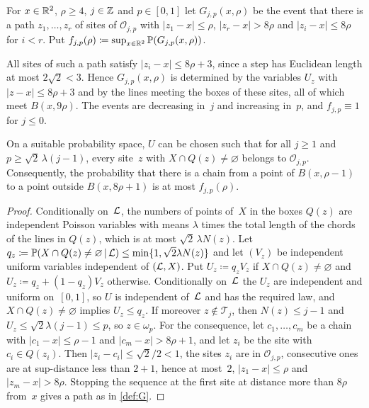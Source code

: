 \documentclass[11pt,letterpaper]{article}
\newcommand{\cO}{\mathcal O}
\newcommand{\cT}{\mathcal T}
\begin{document}
\begin{definition}
\label{def:G}
For $x\in\mathbb R^2$, $\rho\ge4$, $j\in\mathbb Z$ and $p\in[0,1]$ let $G_{j,p}(x,\rho)$ be the event that there is a path $z_1,\dots,z_r$ of sites of $\cO_{j,p}$ with $\lvert z_1-x\rvert\le\rho$, $\lvert z_r-x\rvert>8\rho$ and $\lvert z_i-x\rvert\le8\rho$ for $i<r$. Put $f_{j,p}(\rho)\coloneqq\sup_{x\in\mathbb R^2}\mathbb P(G_{j,p}(x,\rho))$.
\end{definition}

All sites of such a path satisfy $\lvert z_i-x\rvert\le8\rho+3$, since a step has Euclidean length at most $2\sqrt2<3$. Hence $G_{j,p}(x,\rho)$ is determined by the variables $U_z$ with $\lvert z-x\rvert\le8\rho+3$ and by the lines meeting the boxes of these sites, all of which meet $B(x,9\rho)$. The events are decreasing in~$j$ and increasing in~$p$, and $f_{j,p}\equiv1$ for $j\le0$.

\begin{lemma}[Domination]
\label{lem:domination}
On a suitable probability space, $U$ can be chosen such that for all $j\ge1$ and $p\ge\sqrt2\,\lambda(j-1)$, every site~$z$ with $X\cap Q(z)\neq\varnothing$ belongs to $\cO_{j,p}$. Consequently, the probability that there is a chain from a point of $B(x,\rho-1)$ to a point outside $B(x,8\rho+1)$ is at most $f_{j,p}(\rho)$.
\end{lemma}

\begin{proof}
Conditionally on~$\mathcal L$, the numbers of points of~$X$ in the boxes $Q(z)$ are independent Poisson variables with means $\lambda$ times the total length of the chords of the lines in $Q(z)$, which is at most $\sqrt2\,\lambda N(z)$. Let $q_z\coloneqq\mathbb P(X\cap Q(z)\neq\varnothing\,\vert\,\mathcal L)\le\min\{1,\sqrt2\lambda N(z)\}$ and let $(V_z)$ be independent uniform variables independent of $(\mathcal L,X)$. Put $U_z\coloneqq q_zV_z$ if $X\cap Q(z)\neq\varnothing$ and $U_z\coloneqq q_z+(1-q_z)V_z$ otherwise. Conditionally on~$\mathcal L$ the $U_z$ are independent and uniform on~$[0,1]$, so $U$ is independent of~$\mathcal L$ and has the required law, and $X\cap Q(z)\neq\varnothing$ implies $U_z\le q_z$. If moreover $z\notin\cT_j$, then $N(z)\le j-1$ and $U_z\le\sqrt2\lambda(j-1)\le p$, so $z\in\omega_p$. For the consequence, let $c_1,\dots,c_m$ be a chain with $\lvert c_1-x\rvert\le\rho-1$ and $\lvert c_m-x\rvert>8\rho+1$, and let $z_i$ be the site with $c_i\in Q(z_i)$. Then $\lvert z_i-c_i\rvert\le\sqrt2/2<1$, the sites $z_i$ are in $\cO_{j,p}$, consecutive ones are at sup-distance less than $2+1$, hence at most~$2$, $\lvert z_1-x\rvert\le\rho$ and $\lvert z_m-x\rvert>8\rho$. Stopping the sequence at the first site at distance more than $8\rho$ from~$x$ gives a path as in \cref{def:G}.
\end{proof}
\end{document}
